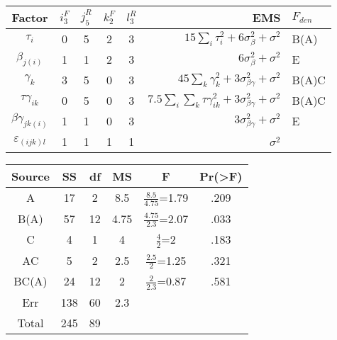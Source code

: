 \documentclass[
  10pt,
  twocolumn]{article}
\begin{document}
\begin{tabular}{c|cccc|r|l}
    Factor & $i^F_3$ & $j^R_5$ & $k^F_2$ & $l^R_3$ & EMS & $F_{den}$ \\\hline
    $\tau_i$               & 0 & 5 & 2 & 3 & $15\sum_{i}\tau_i^2 + 6\sigma^2_\beta + \sigma^2$ & B(A) \\
    $\beta_{j(i)}$         & 1 & 1 & 2 & 3 & $6\sigma^2_\beta + \sigma^2$                      & E \\
    $\gamma_k$             & 3 & 5 & 0 & 3 & $45\sum_k\gamma_k^2+3\sigma^2_{\beta\gamma}+\sigma^2$ & B(A)C\\
    $\tau\gamma_{ik}$      & 0 & 5 & 0 & 3 & $7.5\sum_i\sum_k\tau\gamma^2_{ik} +3\sigma^2_{\beta\gamma} + \sigma^2$     & B(A)C \\
    $\beta\gamma_{jk(i)}$  & 1 & 1 & 0 & 3 & $3\sigma^2_{\beta\gamma} + \sigma^2$              & E \\
    $\varepsilon_{(ijk)l}$ & 1 & 1 & 1 & 1 & $\sigma^2$                                      & \\
\end{tabular}
\begin{tabular}{|c|c|c|c|c|c|}\hline
         Source & SS & df & MS & F & Pr(>F) \\\hline
         A & 17 & 2 & 8.5 & $\frac{8.5}{4.75}$=1.79 & .209\\
         B(A) & 57 & 12 & 4.75 & $\frac{4.75}{2.3}$=2.07 & .033\\
         C & 4 & 1 & 4 & $\frac{4}{2}$=2 & .183\\
         AC & 5 & 2 & 2.5 & $\frac{2.5}{2}$=1.25 & .321\\
         BC(A) & 24 & 12 & 2 & $\frac{2}{2.3}$=0.87 & .581\\
         Err & 138 & 60 & 2.3 & & \\
         Total & 245 & 89 & & & \\\hline
\end{tabular}
\end{document}
